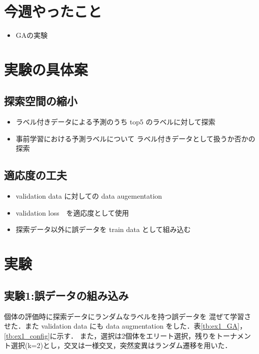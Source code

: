 \documentclass[twocolumn]{jarticle}     %
\begin{document}


\section{今週やったこと}

\begin{itemize}
	\item GAの実験
\end{itemize}

\section{実験の具体案}
\subsection{探索空間の縮小}
\begin{itemize}
	\item ラベル付きデータによる予測のうち top5 のラベルに対して探索
	\item 事前学習における予測ラベルについて
	ラベル付きデータとして扱うか否かの探索
\end{itemize}
\subsection{適応度の工夫}
\begin{itemize}
	\item validation data に対しての data augementation
	\item validation loss　を適応度として使用
	\item 探索データ以外に誤データを train data として組み込む
\end{itemize}

\section{実験}
\subsection{実験1:誤データの組み込み}
個体の評価時に探索データにランダムなラベルを持つ誤データを
混ぜて学習させた．また validation data にも data augmentation をした．表\ref{tb:ex1_GA}，\ref{tb:ex1_config}に示す．
また，選択は2個体をエリート選択，残りをトーナメント選択(k=2)とし，交叉は一様交叉，突然変異はランダム遷移を用いた．
\end{document}
